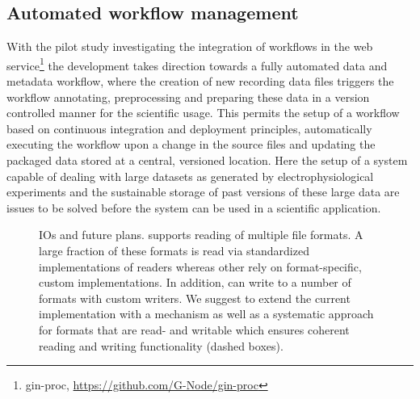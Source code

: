 \subsection{Automated workflow management}
With the pilot study investigating the integration of  workflows in the  web service\footnote{gin-proc, \url{https://github.com/G-Node/gin-proc}} the development takes direction towards a fully automated data and metadata workflow, where the creation of new recording data files triggers the workflow annotating, preprocessing and preparing these data in a version controlled manner for the scientific usage. This permits the setup of a workflow based on continuous integration and deployment principles, automatically executing the workflow upon a change in the source files and updating the packaged data stored at a central, versioned location. Here the setup of a system capable of dealing with large datasets as generated by electrophysiological experiments and the sustainable storage of past versions of these large data are issues to be solved before the system can be used in a scientific application.

\begin{figure}
 
 \caption[ IOs and future plans]{ IOs and future plans.  supports reading of multiple file formats. A large fraction of these formats is read via standardized implementations of readers whereas other rely on format-specific, custom implementations. In addition,  can write to a number of formats with custom writers. We suggest to extend the current implementation with a  mechanism as well as a systematic  approach for formats that are read- and writable which ensures coherent reading and writing functionality (dashed boxes).}
 \label{fig:disc_neo_plans}
\end{figure}

